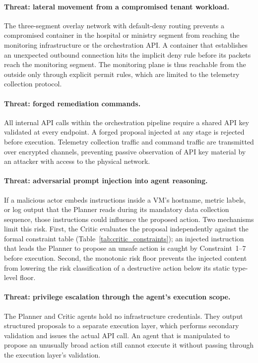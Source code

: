 \documentclass[12pt,a4paper]{report}
\begin{document}
\paragraph{Threat: lateral movement from a compromised tenant workload.}
The three-segment overlay network with default-deny routing prevents a compromised
container in the hospital or ministry segment from reaching the monitoring
infrastructure or the orchestration API. A container that establishes an unexpected
outbound connection hits the implicit deny rule before its packets reach the
monitoring segment. The monitoring plane is thus reachable from the outside only
through explicit permit rules, which are limited to the telemetry collection protocol.

\paragraph{Threat: forged remediation commands.}
All internal API calls within the orchestration pipeline require a shared API key
validated at every endpoint. A forged proposal injected at any stage is rejected
before execution. Telemetry collection traffic and command traffic are transmitted
over encrypted channels, preventing passive observation of API key material by
an attacker with access to the physical network.

\paragraph{Threat: adversarial prompt injection into agent reasoning.}
If a malicious actor embeds instructions inside a VM's hostname, metric labels, or
log output that the Planner reads during its mandatory data collection sequence, those
instructions could influence the proposed action. Two mechanisms limit this risk.
First, the Critic evaluates the proposal independently against the formal constraint
table (Table~\ref{tab:critic_constraints}); an injected instruction that leads the
Planner to propose an unsafe action is caught by Constraint~1--7 before execution.
Second, the monotonic risk floor prevents the injected content from lowering the risk
classification of a destructive action below its static type-level floor.

\paragraph{Threat: privilege escalation through the agent's execution scope.}
The Planner and Critic agents hold no infrastructure credentials. They output
structured proposals to a separate execution layer, which performs secondary
validation and issues the actual API call. An agent that is manipulated to propose
an unusually broad action still cannot execute it without passing through the execution
layer's validation.
\end{document}
